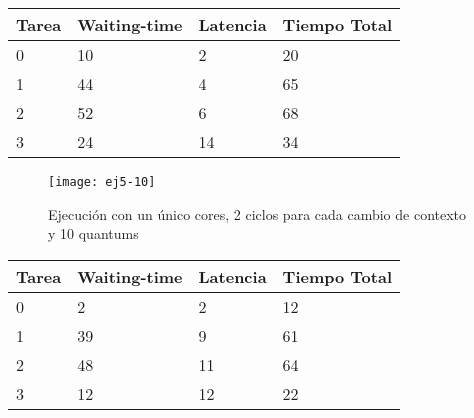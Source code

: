 \begin{center}
		\begin{tabular}{| l | l | l | l |}
				\hline
				Tarea & Waiting-time & Latencia & Tiempo Total	\\ \hline
				0 & 10 & 2  & 20 \\
				1 & 44 & 4  & 65 \\
				2 & 52 & 6  & 68 \\
				3 & 24 & 14 & 34 \\
				\hline
		\end{tabular}
\end{center}


\begin{figure}[H]
		\centering
		\texttt{[image: ej5-10]}
		\caption{Ejecución con un único cores, 2 ciclos para cada cambio de contexto y 10 quantums}
		\label{fig:ej5-10}
\end{figure}

\begin{center}
		\begin{tabular}{| l | l | l | l |}
				\hline
				Tarea & Waiting-time & Latencia & Tiempo Total	\\ \hline
				0     &  2           &  2       & 12            \\
				1     &  39          &  9       & 61            \\
				2     &  48          &  11      & 64            \\
				3     &  12          &  12      & 22            \\
				\hline
		\end{tabular}
\end{center}

